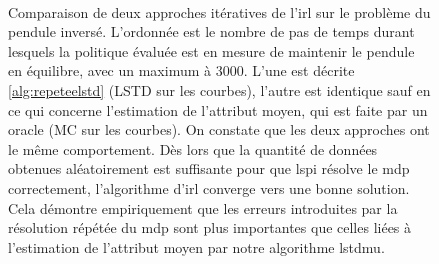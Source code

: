\documentclass[frenchb,a4paper,justified,notoc]{tufte-book}
\begin{document}
\begin{figure}
\centering
{}
\\
\caption[ itératif et  sur le pendule]{Comparaison de deux approches itératives de l'\gls{irl} sur le problème du pendule inversé. L'ordonnée est le nombre de pas de temps durant lesquels la politique évaluée est en mesure de maintenir le pendule en équilibre, avec un maximum à $3000$. L'une est décrite \autoref{alg:repeteelstd} (LSTD sur les courbes), l'autre est identique sauf en ce qui concerne l'estimation de l'attribut moyen, qui est faite par un oracle (MC sur les courbes). On constate que les deux approches ont le même comportement. Dès lors que la quantité de données obtenues aléatoirement est suffisante pour que \gls{lspi} résolve le \gls{mdp} correctement, l'algorithme d'\gls{irl} converge vers une bonne solution. Cela démontre empiriquement que les erreurs introduites par la résolution répétée du \gls{mdp} sont plus importantes que celles liées à l'estimation de l'attribut moyen par notre algorithme \gls{lstdmu}.}

\end{figure}
\end{document}
